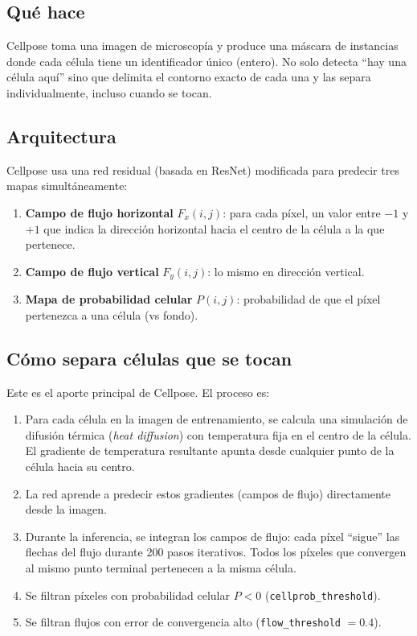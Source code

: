 \documentclass[11pt,a4paper]{article}
\begin{document}
\subsection{Qu\'{e} hace}

Cellpose toma una imagen de microscop\'{i}a y produce una m\'{a}scara de instancias donde cada c\'{e}lula tiene un identificador \'{u}nico (entero). No solo detecta ``hay una c\'{e}lula aqu\'{i}'' sino que delimita el contorno exacto de cada una y las separa individualmente, incluso cuando se tocan.

\subsection{Arquitectura}

Cellpose usa una red residual (basada en ResNet) modificada para predecir tres mapas simult\'{a}neamente:

\begin{enumerate}
  \item \textbf{Campo de flujo horizontal} $F_x(i,j)$: para cada p\'{i}xel, un valor entre $-1$ y $+1$ que indica la direcci\'{o}n horizontal hacia el centro de la c\'{e}lula a la que pertenece.
  \item \textbf{Campo de flujo vertical} $F_y(i,j)$: lo mismo en direcci\'{o}n vertical.
  \item \textbf{Mapa de probabilidad celular} $P(i,j)$: probabilidad de que el p\'{i}xel pertenezca a una c\'{e}lula (vs fondo).
\end{enumerate}

\subsection{C\'{o}mo separa c\'{e}lulas que se tocan}

Este es el aporte principal de Cellpose. El proceso es:

\begin{enumerate}
  \item Para cada c\'{e}lula en la imagen de entrenamiento, se calcula una simulaci\'{o}n de difusi\'{o}n t\'{e}rmica (\textit{heat diffusion}) con temperatura fija en el centro de la c\'{e}lula. El gradiente de temperatura resultante apunta desde cualquier punto de la c\'{e}lula hacia su centro.
  \item La red aprende a predecir estos gradientes (campos de flujo) directamente desde la imagen.
  \item Durante la inferencia, se integran los campos de flujo: cada p\'{i}xel ``sigue'' las flechas del flujo durante 200 pasos iterativos. Todos los p\'{i}xeles que convergen al mismo punto terminal pertenecen a la misma c\'{e}lula.
  \item Se filtran p\'{i}xeles con probabilidad celular $P < 0$ (\texttt{cellprob\_threshold}).
  \item Se filtran flujos con error de convergencia alto (\texttt{flow\_threshold} $= 0.4$).
\end{enumerate}
\end{document}
